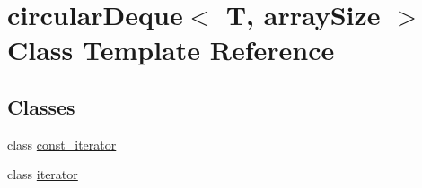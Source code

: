 \hypertarget{classcircularDeque}{\section{circular\+Deque$<$ T, array\+Size $>$ Class Template Reference}
\label{classcircularDeque}
}
\subsection*{Classes}
\begin{DoxyCompactItemize}
\item 
class \hyperlink{classcircularDeque_1_1const__iterator}{const\+\_\+iterator}
\item 
class \hyperlink{classcircularDeque_1_1iterator}{iterator}
\end{DoxyCompactItemize}
